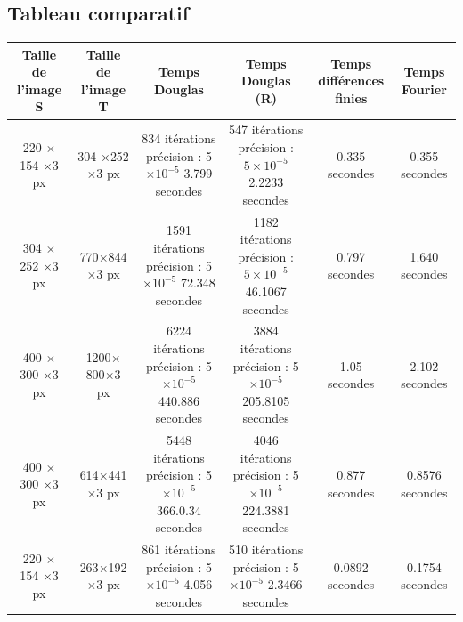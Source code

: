 \subsection{Tableau comparatif}
\begin{tabular}{|c|c|c|c|c|c|}
\hline
Taille de l'image S & Taille de l'image T& Temps Douglas & \shortstack{Temps Douglas \\(R)} &\shortstack{Temps différences\\ finies} & Temps Fourier\\
\hline
220 $\times$ 154 $\times$3 px & 304 $\times $252 $\times $3 px &  \shortstack{ 834 itérations\\ précision : 5$\times 10^{-5}$\\3.799 secondes} &\shortstack{ 547 itérations\\
précision : $5 \times 10^{-5}$\\ 2.2233 secondes}&  0.335 secondes & 0.355 secondes \\

\hline
304 $\times$ 252 $\times$3 px & 770$\times$844 $\times $3 px & \shortstack{ 1591 itérations\\ précision : 5$\times 10^{-5}$\\72.348 secondes} & \shortstack{ 1182 itérations\\
précision : $5 \times 10^{-5}$\\ 46.1067 secondes} & 0.797 secondes & 1.640 secondes \\
\hline
400 $\times$ 300 $\times$3 px & 1200$\times$800$\times $3 px & \shortstack{ 6224 itérations\\ précision : 5$\times 10^{-5}$\\440.886 secondes} &\shortstack{3884 itérations\\ précision : 5$\times 10^{-5}$\\205.8105 secondes} &1.05 secondes & 2.102 secondes \\
\hline
400 $\times$ 300 $\times$3 px & 614$\times$441$\times $3 px & \shortstack{ 5448 itérations\\ précision : 5$\times 10^{-5}$\\366.0.34 secondes}&\shortstack{4046 itérations\\ précision : 5$\times 10^{-5}$\\224.3881 secondes} & 0.877 secondes & 0.8576 secondes \\
\hline
220 $\times$ 154 $\times$3 px & 263$\times$192$\times $3 px & \shortstack{ 861 itérations\\ précision : 5$\times 10^{-5}$\\4.056 secondes} &\shortstack{510 itérations\\ précision : 5$\times 10^{-5}$\\2.3466 secondes}& 0.0892 secondes & 0.1754 secondes \\
\hline
\end{tabular}\\
